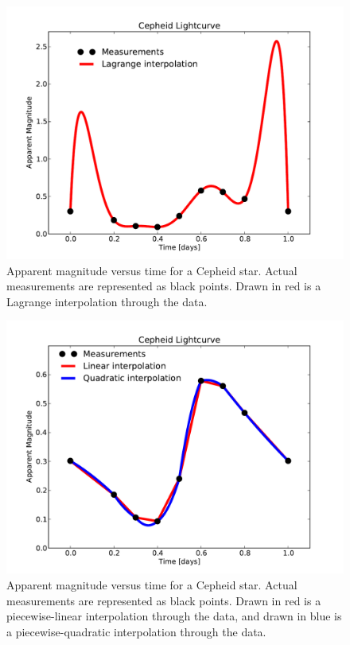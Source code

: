 \documentclass{article}
\begin{document}
\begin{spacing}{1.1}
\begin{figure}[H]
 \label{fig4-1}
 \includegraphics[width=\textwidth]{problem4_fig1.pdf}
 \caption{Apparent magnitude versus time for a Cepheid star. Actual measurements are represented as black points. Drawn in red is a Lagrange interpolation through the data.}
\end{figure} 

\begin{figure}[H]
 \label{fig4-2}
 \includegraphics[width=\textwidth]{problem4_fig2.pdf}
 \caption{Apparent magnitude versus time for a Cepheid star. Actual measurements are represented as black points. Drawn in red is a piecewise-linear interpolation through the data, and drawn in blue is a piecewise-quadratic interpolation through the data.}
\end{figure} 


\end{spacing}
\end{document}
